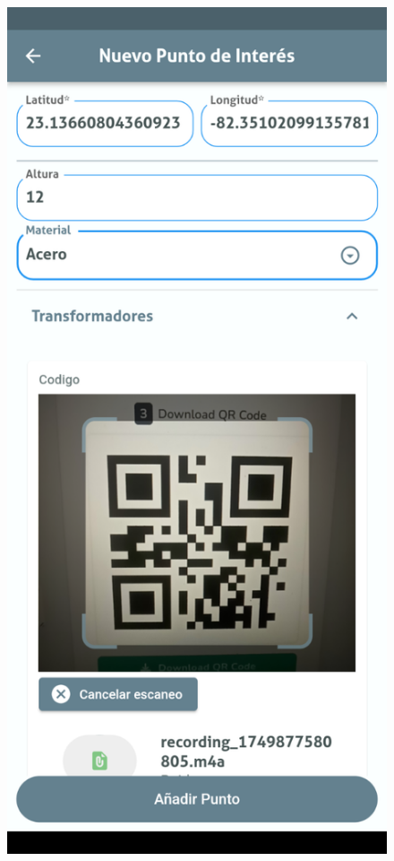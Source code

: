 \documentclass[12pt, a4paper]{book}
\begin{document}
\begin{figure}[H]
  \centering
  \begin{minipage}[b]{0.3\textwidth}
    \centering
    \includegraphics[width=\textwidth]{images/functionality_test/medias2.png}

\end{minipage}
\end{figure}
\end{document}
